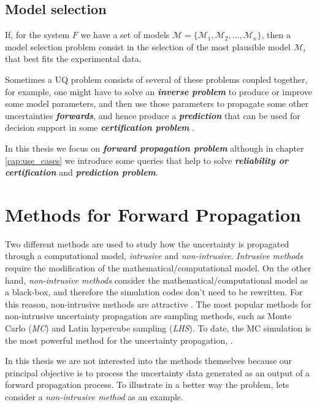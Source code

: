 \subsection{Model selection}
If, for the system $F$ we have a set of models $\mathcal{M} = \lbrace \mathcal{M}_{1}, \mathcal{M}_{2},...,\mathcal{M}_{n} \rbrace$, then a model selection problem consist in the selection of the most plausible model $\mathcal{M}_{i}$ that best fits the experimental data.

Sometimes a UQ problem consists of several of these problems coupled together, for example, one might have to solve an \textbf{\textit{inverse problem}} to produce or improve some model parameters, and then use those parameters to propagate some other uncertainties \textbf{\textit{forwards}}, and hence produce a \textbf{\textit{prediction}} that can be used for decision support in some \textbf{\textit{certification problem}} \cite{Sullivan2015}.

In this thesis we focus on \textbf{\textit{forward propagation problem}} although in chapter \ref{cap:use_cases} we introduce some queries that help to solve \textbf{\textit{reliability or certification}} and \textbf{\textit{prediction problem}}.

\section{Methods for Forward Propagation}\label{sec:methods_uq_propagation}

Two different methods are used to study how the uncertainty is propagated through a computational model, \textit{intrusive} and \textit{non-intrusive}. \textit{Intrusive methods} require the modification of the mathematical/computational model. On the other hand, \textit{non-intrusive methods} consider the mathematical/computational model as a black-box, and therefore the simulation codes don't need to be rewritten. For this reason, non-intrusive methods are attractive \cite{Kawai2014}. The most popular methods for non-intrusive uncertainty propagation are sampling methods, such as Monte Carlo (\textit{MC}) and Latin hypercube sampling (\textit{LHS}). To date, the MC simulation is the most powerful method for the uncertainty propagation, \cite{Rajan2016a}.

In this thesis we are not interested into the methods themselves because our principal objective is to process the uncertainty data generated as an output of a forward propagation process. To illustrate in a better way the problem, lets consider a \textit{non-intrusive method} as an example.

